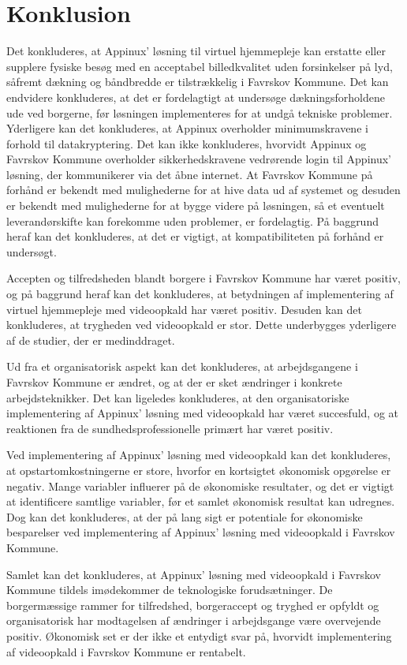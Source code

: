 \chapter{Konklusion}

Det konkluderes, at Appinux’ løsning til virtuel hjemmepleje kan erstatte eller supplere fysiske besøg med en acceptabel billedkvalitet uden forsinkelser på lyd, såfremt dækning og båndbredde er tilstrækkelig i Favrskov Kommune. Det kan endvidere konkluderes, at det er fordelagtigt at undersøge dækningsforholdene ude ved borgerne, før løsningen implementeres for at undgå tekniske problemer.
Yderligere kan det konkluderes, at Appinux overholder minimumskravene i forhold til datakryptering. Det kan ikke konkluderes, hvorvidt Appinux og Favrskov Kommune overholder sikkerhedskravene vedrørende login til Appinux' løsning, der kommunikerer via det åbne internet. 
At Favrskov Kommune på forhånd er bekendt med mulighederne for at hive data ud af systemet og desuden er bekendt med mulighederne for at bygge videre på løsningen, så et eventuelt leverandørskifte kan forekomme uden problemer, er fordelagtig. På baggrund heraf kan det konkluderes, at det er vigtigt, at kompatibiliteten på forhånd er undersøgt.

Accepten og tilfredsheden blandt borgere i Favrskov Kommune har været positiv, og på baggrund heraf kan det konkluderes, at betydningen af implementering af virtuel hjemmepleje med videoopkald har været positiv. Desuden kan det konkluderes, at trygheden ved videoopkald er stor. Dette underbygges yderligere af de studier, der er medinddraget.

Ud fra et organisatorisk aspekt kan det konkluderes, at arbejdsgangene i Favrskov Kommune er ændret, og at der er sket ændringer i konkrete arbejdsteknikker. 
Det kan ligeledes konkluderes, at den organisatoriske implementering af Appinux' løsning med videoopkald har været succesfuld, og at reaktionen fra de sundhedsprofessionelle primært har været positiv. 

Ved implementering af Appinux' løsning med videoopkald kan det konkluderes, at opstartomkostningerne er store, hvorfor en kortsigtet økonomisk opgørelse er negativ.
Mange variabler influerer på de økonomiske resultater, og det er vigtigt at identificere samtlige variabler, før et samlet økonomisk resultat kan udregnes. Dog kan det konkluderes, at der på lang sigt er potentiale for økonomiske besparelser ved implementering af Appinux' løsning med videoopkald i Favrskov Kommune.  

Samlet kan det konkluderes, at Appinux’ løsning med videoopkald i Favrskov Kommune tildels imødekommer de teknologiske forudsætninger. De borgermæssige rammer for tilfredshed, borgeraccept og tryghed er opfyldt og organisatorisk har modtagelsen af ændringer i arbejdsgange være overvejende positiv. Økonomisk set er der ikke et entydigt svar på, hvorvidt implementering af videoopkald i Favrskov Kommune er rentabelt.






